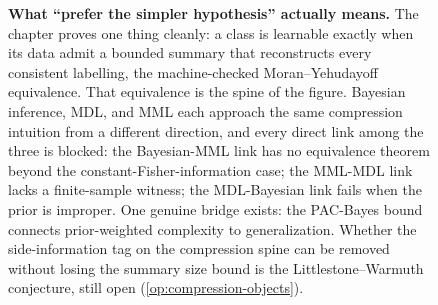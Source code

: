 \begin{figure}[ht]
\caption[Three model-selection principles organized around a proven compression equivalence]{\textbf{What ``prefer the simpler hypothesis'' actually means.} The chapter proves one thing cleanly: a class is learnable exactly when its data admit a bounded summary that reconstructs every consistent labelling, the machine-checked Moran--Yehudayoff equivalence. That equivalence is the spine of the figure. Bayesian inference, MDL, and MML each approach the same compression intuition from a different direction, and every direct link among the three is blocked: the Bayesian-MML link has no equivalence theorem beyond the constant-Fisher-information case; the MML-MDL link lacks a finite-sample witness; the MDL-Bayesian link fails when the prior is improper. One genuine bridge exists: the PAC-Bayes bound connects prior-weighted complexity to generalization. Whether the side-information tag on the compression spine can be removed without losing the summary size bound is the Littlestone--Warmuth conjecture, still open (\cref{op:compression-objects}).}
\label{fig:model-selection-triangle}
\end{figure}

